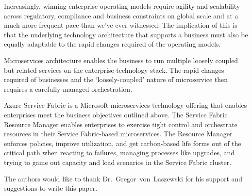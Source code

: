 Increasingly, winning enterprise operating models require agility and
scalability across regulatory, compliance and business constraints on
global scale and at a much more frequent pace than we’ve ever
witnessed. The implication of this is that the underlying technology
architecture that supports a business must also be equally adaptable
to the rapid changes required of the operating models.

Microservices architecture enables the business to run multiple
loosely coupled but related services on the enterprise technology
stack. The rapid changes required of businesses and the
‘loosely-coupled’ nature of microservice then requires a carefully
managed orchestration.

Azure Service Fabric is a Microsoft microservices technology offering
that enables enterprises meet the business objectives outlined
above. The Service Fabric Resource Manager enables enterprises to
exercise tight control and orchestrate resources in their Service
Fabric-based microservices. The Resource Manager enforces policies,
improve utilization, and get carbon-based life forms out of the
critical path when reacting to failures, managing processes like
upgrades, and trying to game out capacity and load scenarios in the
Service Fabric cluster.


\begin{acks}

  The authors would like to thank Dr.~Gregor~von~Laszewski for his
  support and suggestions to write this paper.

\end{acks}



